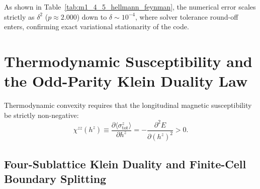 As shown in Table~\ref{tab:m1_4_5_hellmann_feynman}, the numerical error scales strictly as $\delta^2$ ($p \approx 2.000$) down to $\delta \sim 10^{-4}$, where solver tolerance round-off enters, confirming exact variational stationarity of the code.




\section{Thermodynamic Susceptibility and the Odd-Parity Klein Duality Law}
\label{sec:m1_4_5_klein_duality}

Thermodynamic convexity requires that the longitudinal magnetic susceptibility be strictly non-negative:
\begin{equation}
\label{eq:m1_4_5_susceptibility_condition}
\chi^{zz}(h^z) \equiv \frac{\partial \langle \sigma_{\mathrm{tot}}^z \rangle}{\partial h^z} = -\frac{\partial^2 E}{\partial (h^z)^2} > 0.
\end{equation}

\begin{table}[htbp]
\centering
\caption{Thermodynamic susceptibility along $[0, 0, h_z]$ (\texttt{susceptibility\_curve.dat}).}
\label{tab:m1_4_5_susceptibility}
\vspace{2mm}
\end{table}



\subsection{Four-Sublattice Klein Duality and Finite-Cell Boundary Splitting}
\label{subsec:m1_4_5_klein_duality}

